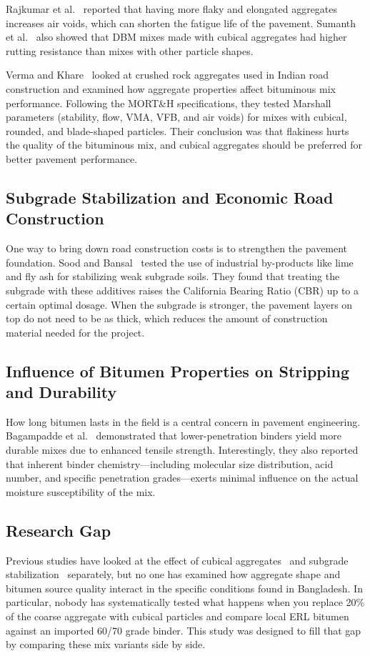 \documentclass[12pt,a4paper]{article}
\begin{document}
Rajkumar et al.~\cite{rajkumar2018experimental} reported that having more flaky and elongated aggregates increases air voids, which can shorten the fatigue life of the pavement. Sumanth et al.~\cite{sumanth2017study} also showed that DBM mixes made with cubical aggregates had higher rutting resistance than mixes with other particle shapes.

Verma and Khare~\cite{verma2024study} looked at crushed rock aggregates used in Indian road construction and examined how aggregate properties affect bituminous mix performance. Following the MORT\&H specifications, they tested Marshall parameters (stability, flow, VMA, VFB, and air voids) for mixes with cubical, rounded, and blade-shaped particles. Their conclusion was that flakiness hurts the quality of the bituminous mix, and cubical aggregates should be preferred for better pavement performance.

\subsection{Subgrade Stabilization and Economic Road Construction}
One way to bring down road construction costs is to strengthen the pavement foundation. Sood and Bansal~\cite{sood2015evaluation} tested the use of industrial by-products like lime and fly ash for stabilizing weak subgrade soils. They found that treating the subgrade with these additives raises the California Bearing Ratio (CBR) up to a certain optimal dosage. When the subgrade is stronger, the pavement layers on top do not need to be as thick, which reduces the amount of construction material needed for the project.

\subsection{Influence of Bitumen Properties on Stripping and Durability}
How long bitumen lasts in the field is a central concern in pavement engineering. Bagampadde et al.~\cite{bagampadde2006impact} demonstrated that lower-penetration binders yield more durable mixes due to enhanced tensile strength. Interestingly, they also reported that inherent binder chemistry---including molecular size distribution, acid number, and specific penetration grades---exerts minimal influence on the actual moisture susceptibility of the mix.

\subsection{Research Gap}
Previous studies have looked at the effect of cubical aggregates~\cite{teja2020effect, sumanth2017study} and subgrade stabilization~\cite{sood2015evaluation} separately, but no one has examined how aggregate shape and bitumen source quality interact in the specific conditions found in Bangladesh. In particular, nobody has systematically tested what happens when you replace 20\% of the coarse aggregate with cubical particles and compare local ERL bitumen against an imported 60/70 grade binder. This study was designed to fill that gap by comparing these mix variants side by side.
\end{document}

